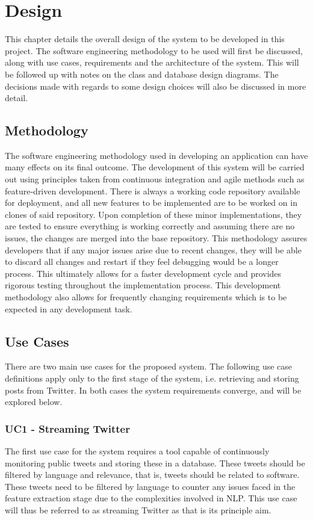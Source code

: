 \chapter{Design}
\label{cha:design}
This chapter details the overall design of the system to be developed in this project. The software engineering methodology to be used will first be discussed, along with use cases, requirements and the architecture of the system. This will be followed up with notes on the class and database design diagrams. The decisions made with regards to some design choices will also be discussed in more detail.

\section{Methodology}
The software engineering methodology used in developing an application can have many effects on its final outcome. The development of this system will be carried out using principles taken from continuous integration and agile methods such as feature-driven development. There is always a working code repository available for deployment, and all new features to be implemented are to be worked on in clones of said repository. Upon completion of these minor implementations, they are tested to ensure everything is working correctly and assuming there are no issues, the changes are merged into the base repository. This methodology assures developers that if any major issues arise due to recent changes, they will be able to discard all changes and restart if they feel debugging would be a longer process. This ultimately allows for a faster development cycle and provides rigorous testing throughout the implementation process. This development methodology also allows for frequently changing requirements which is to be expected in any development task.

\section{Use Cases}
\label{sec:uc}
There are two main use cases for the proposed system. The following use case definitions apply only to the first stage of the system, i.e. retrieving and storing posts from Twitter. In both cases the system requirements converge, and will be explored below.

\subsection[Use Case 1]{UC1 - Streaming Twitter}
The first use case for the system requires a tool capable of continuously monitoring public tweets and storing these in a database. These tweets should be filtered by language and relevance, that is, tweets should be related to software. These tweets need to be filtered by language to counter any issues faced in the feature extraction stage due to the complexities involved in NLP. This use case will thus be referred to as streaming Twitter as that is its principle aim.

